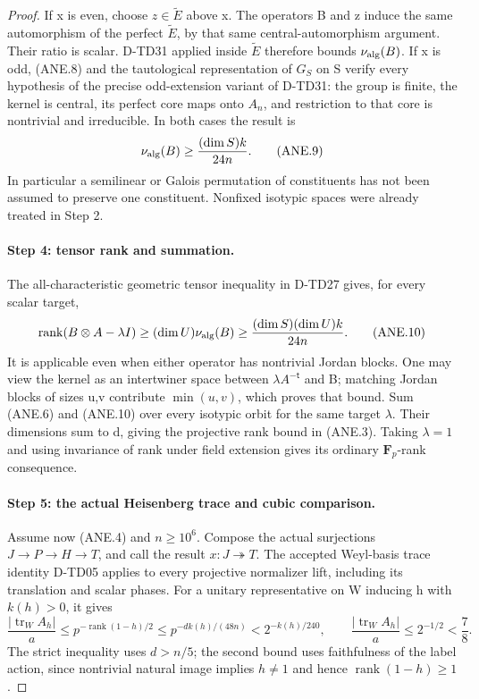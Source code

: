 \begin{proof}
If x is even, choose \(z\in\widetilde E\) above x.  The
operators B and z induce the same automorphism of the perfect
\(\widetilde E\), by that same central-automorphism argument.
Their ratio is scalar.  D-TD31 applied inside \(\widetilde E\)
therefore bounds \(\nu_{\rm alg}(B)\).  If x is odd, (ANE.8) and the tautological
representation of \(G_S\) on S verify every hypothesis of
the precise odd-extension variant of D-TD31: the group is
finite, the kernel is central, its perfect core maps onto
\(A_n\), and restriction to that core is nontrivial and
irreducible.  In both cases the result is
\[
               \nu_{\rm alg}(B)\ge
                   \frac{(\dim S)k}{24n}.
 \tag{ANE.9}
\]
In particular a semilinear or Galois permutation of constituents
has not been assumed to preserve one constituent.  Nonfixed
isotypic spaces were already treated in Step 2.

\paragraph{Step 4: tensor rank and summation.}
The all-characteristic geometric tensor inequality in D-TD27
gives, for every scalar target,
\[
 \operatorname{rank}(B\otimes A-\lambda I)
      \ge (\dim U)\nu_{\rm alg}(B)
      \ge\frac{(\dim S)(\dim U)k}{24n}.
 \tag{ANE.10}
\]
It is applicable even when either operator has nontrivial Jordan
blocks.  One may view the kernel as an intertwiner space between
\(\lambda A^{-\mathsf t}\) and B; matching Jordan blocks of
sizes u,v contribute \(\min(u,v)\), which proves that bound.
Sum (ANE.6) and (ANE.10) over every isotypic orbit for the same
target \(\lambda\).  Their dimensions sum to d, giving the
projective rank bound in (ANE.3).  Taking \(\lambda=1\) and
using invariance of rank under field extension gives its ordinary
\(\mathbf F_p\)-rank consequence.

\paragraph{Step 5: the actual Heisenberg trace and cubic comparison.}
Assume now (ANE.4) and \(n\ge10^6\).  Compose the actual
surjections \(J\to P\to H\to T\), and call the result
\(x:J\twoheadrightarrow T\).  The accepted Weyl-basis trace
identity D-TD05 applies to every projective normalizer lift,
including its translation and scalar phases.  For a unitary
representative on W inducing h with \(k(h)>0\), it gives
\[
 \frac{|\operatorname{tr}_W A_h|}{a}
    \le p^{-\operatorname{rank}(1-h)/2}
    \le p^{-d k(h)/(48n)}<2^{-k(h)/240},
 \qquad
 \frac{|\operatorname{tr}_W A_h|}{a}\le2^{-1/2}<\frac78.
 \tag{ANE.11}
\]
The strict inequality uses \(d>n/5\); the second bound uses
faithfulness of the label action, since nontrivial natural image
implies \(h\ne1\) and hence \(\operatorname{rank}(1-h)\ge1\).


\end{proof}
